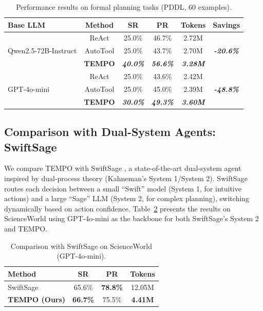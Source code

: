 \documentclass[runningheads]{llncs}
\begin{document}
\begin{table}[htb]
\centering
\small
\caption{Performance results on formal planning tasks (PDDL, 60 examples).}
\label{tab:pddl_detailed}
\vspace{2mm}
\begin{tabular}{lccccc}
\toprule
\textbf{Base LLM} & \textbf{Method} & \textbf{SR} & \textbf{PR} & \textbf{Tokens} & \textbf{Savings}\\
\midrule
\multirow{3}{*}{Qwen2.5-72B-Instruct} & ReAct & 25.0\% & 46.7\% & 2.72M & \multirow{3}{*}{\textsl{\textbf{-20.6\%}}} \\
& AutoTool & 25.0\% & 43.7\% & 2.70M & \\
& \textbf{TEMPO} & \textsl{\textbf{40.0\%}} & \textsl{\textbf{56.6\%}} & \textsl{\textbf{3.28M}} & \\
\midrule
\multirow{3}{*}{GPT-4o-mini} & ReAct & 25.0\% & 43.6\% & 2.42M & \multirow{3}{*}{\textsl{\textbf{-48.8\%}}}\\
& AutoTool & 25.0\% & 45.0\% & 2.39M & \\
& \textbf{TEMPO} & \textsl{\textbf{30.0\%}} & \textsl{\textbf{49.3\%}} & \textsl{\textbf{3.60M}} & \\
\bottomrule
\end{tabular}
\end{table}

\subsection{Comparison with Dual-System Agents: SwiftSage}
We compare TEMPO with SwiftSage \cite{swiftsage}, a state-of-the-art dual-system agent inspired by dual-process theory (Kahneman's System 1/System 2). SwiftSage routes each decision between a small ``Swift'' model (System 1, for intuitive actions) and a large ``Sage'' LLM (System 2, for complex planning), switching dynamically based on action confidence. Table~\ref{tab:swige} presents the results on ScienceWorld using GPT-4o-mini as the backbone for both SwiftSage's System 2 and TEMPO.

\begin{table}[H]
\centering
\small
\caption{Comparison with SwiftSage on ScienceWorld (GPT-4o-mini).}
\label{tab:swige}
\vspace{2mm}
\begin{tabular}{lccc}
\toprule
\textbf{Method} & \textbf{SR} & \textbf{PR} & \textbf{Tokens} \\
\midrule
SwiftSage \cite{swiftsage} & 65.6\% & \textbf{78.8\%} & 12.05M\\
\textbf{TEMPO (Ours)} & \textbf{66.7\%} & 75.5\% & \textbf{4.41M} \\
\bottomrule
\end{tabular}
\end{table}
\end{document}
